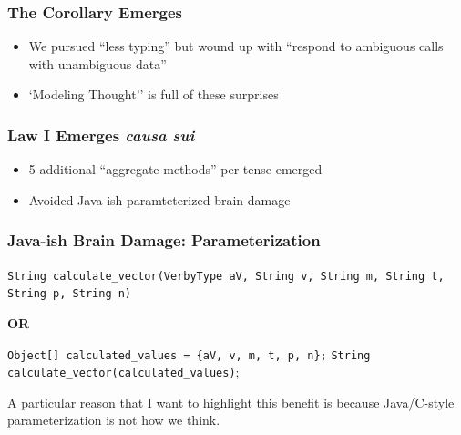 \documentclass[slidestop,compress,mathserif]{beamer}
\begin{document}
\begin{frame}
	\frametitle{The Corollary Emerges}
	\begin{itemize}
		\item 	We pursued ``less typing'' but wound up with ``respond to ambiguous calls with unambiguous data''
		\pause
		\item 	`Modeling Thought'' is full of these surprises
	\end{itemize}
\end{frame}


\begin{frame}
	\frametitle{Law I Emerges \emph{causa sui}}
	\begin{itemize}
		\item 5 additional ``aggregate methods'' per tense emerged
		\pause
		\item Avoided Java-ish paramteterized brain damage
	\end{itemize}
\end{frame}




\begin{frame}
	\frametitle{Java-ish Brain Damage:  Parameterization}	
 	\texttt{String calculate\_vector(VerbyType aV, String v, String m, String t, String p, String n)}
	\vskip 0.5cm

	\begin{center}
		\textbf{OR}
	\end{center}

	\vskip 0.5cm	
	\texttt{Object[] calculated\_values = \{aV, v, m, t, p, n\};} 
	\texttt{String calculate\_vector(calculated\_values)}; 	
\end{frame}
\note
{A particular reason that I want to highlight this benefit is because Java/C-style
parameterization is not how we think.
}
\end{document}
